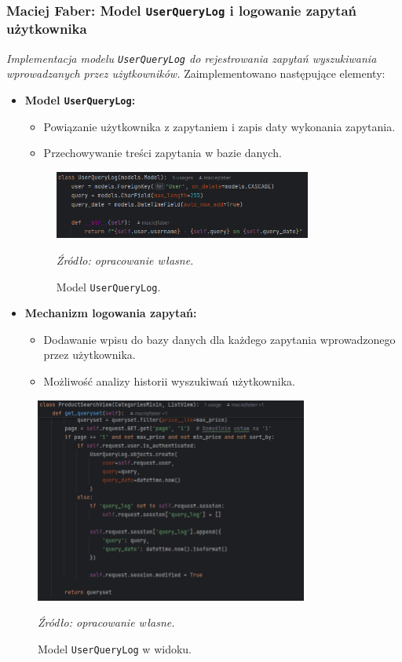 \documentclass[12pt,a4paper,oneside]{article}
\theoremstyle{definition}
\numberwithin{equation}{section}
\begin{document}
\subsubsection{Maciej Faber: Model \texttt{UserQueryLog} i logowanie zapytań użytkownika}
\label{section:1.3.49}
\textit{
Implementacja modelu \texttt{UserQueryLog} do rejestrowania zapytań wyszukiwania wprowadzanych przez użytkowników.
}
Zaimplementowano następujące elementy:
\begin{itemize}
    \item \textbf{Model \texttt{UserQueryLog}:}
    \begin{itemize}
        \item Powiązanie użytkownika z zapytaniem i zapis daty wykonania zapytania.
        \item Przechowywanie treści zapytania w bazie danych.
    \end{itemize}
    \begin{figure}[H]
        \centering
        \includegraphics[width=0.8\textwidth]{images/krzysztofBImages/query_log_model.png}
        \caption{Model \texttt{UserQueryLog}.}
        \emph{Źródło: opracowanie własne.}
        \label{fig:user_query_log_model}
    \end{figure}
    \item \textbf{Mechanizm logowania zapytań:}
    \begin{itemize}
        \item Dodawanie wpisu do bazy danych dla każdego zapytania wprowadzonego przez użytkownika.
        \item Możliwość analizy historii wyszukiwań użytkownika.
    \end{itemize}
\end{itemize}
\begin{figure}[H]
    \centering
    \includegraphics[width=0.8\textwidth]{images/krzysztofBImages/query_log_usage.png}
    \caption{Model \texttt{UserQueryLog} w widoku.}
    \emph{Źródło: opracowanie własne.}
    \label{fig:user_query_log}
\end{figure}
%
%
\end{document}
